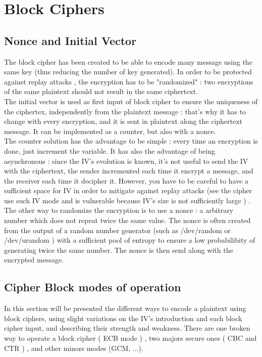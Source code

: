 \section{ Block Ciphers }


\subsection{Nonce and Initial Vector}

The block cipher has been created to be able to encode many message using the same key (thus reducing the number of key generated). In order to be protected against replay attacks , the encryption has to be "randomized" : two encryptions of the same plaintext should not result in the same ciphertext. \\
The initial vector is used as first input of block cipher to ensure the uniqueness of the ciphertex, independently from the plaintext message : that's why it has to change with every encryption, and it is sent in plaintext along the ciphertext message. It can be implemented as a counter, but also with  a nonce.\\
The counter solution has the advantage to be simple : every time an encryption is done, just increment the variable. It has also the advantage of being asynchronous : since the IV's evolution is known, it's not useful to send the IV with the ciphertext, the sender incremented each time it encrypt a message, and the receiver each time it decipher it. However, you have to be careful to have a sufficient space for IV in order to mitigate against replay attacks (see the \cite{WEP} cipher use such IV mode and is vulnerable because IV's size is not sufficiently large )  . \\
The other way to randomize the encryption is to use a nonce : a arbitrary number which does not repeat twice the same value. The nonce is often created from the output of a random number generator (such as /dev/random or /dev/urandom ) with a sufficient pool of entropy to ensure a low probabilibity of generating twice the same number. The nonce is then send along with the encrypted message. 

\subsection{ Cipher Block modes of operation }

In this section will be presented the different ways to encode a plaintext using block ciphers, using slight variations on the IV's introduction and each block cipher input, and describing their strength and weakness. There are one broken way to operate a block cipher ( ECB mode ) , two majors secure ones ( CBC and CTR ) , and other minors modes (GCM, ...).

